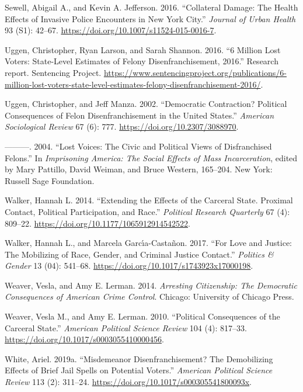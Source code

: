 \documentclass[12pt,]{article}
\begin{document}
\leavevmode\hypertarget{ref-Sewell2016}{}%
Sewell, Abigail A., and Kevin A. Jefferson. 2016. ``Collateral Damage: The Health Effects of Invasive Police Encounters in New York City.'' \emph{Journal of Urban Health} 93 (S1): 42--67. \url{https://doi.org/10.1007/s11524-015-0016-7}.

\leavevmode\hypertarget{ref-sentencing_2016}{}%
Uggen, Christopher, Ryan Larson, and Sarah Shannon. 2016. ``6 Million Lost Voters: State-Level Estimates of Felony Disenfranchisement, 2016.'' Research report. Sentencing Project. \url{https://www.sentencingproject.org/publications/6-million-lost-voters-state-level-estimates-felony-disenfranchisement-2016/}.

\leavevmode\hypertarget{ref-Uggen2002}{}%
Uggen, Christopher, and Jeff Manza. 2002. ``Democratic Contraction? Political Consequences of Felon Disenfranchisement in the United States.'' \emph{American Sociological Review} 67 (6): 777. \url{https://doi.org/10.2307/3088970}.

\leavevmode\hypertarget{ref-Uggen2004}{}%
---------. 2004. ``Lost Voices: The Civic and Political Views of Disfranchised Felons.'' In \emph{Imprisoning America: The Social Effects of Mass Incarceration}, edited by Mary Pattillo, David Weiman, and Bruce Western, 165--204. New York: Russell Sage Foundation.

\leavevmode\hypertarget{ref-Walker2014}{}%
Walker, Hannah L. 2014. ``Extending the Effects of the Carceral State. Proximal Contact, Political Participation, and Race.'' \emph{Political Research Quarterly} 67 (4): 809--22. \url{https://doi.org/10.1177/1065912914542522}.

\leavevmode\hypertarget{ref-Walker2017}{}%
Walker, Hannah L., and Marcela Garcı́a-Castañon. 2017. ``For Love and Justice: The Mobilizing of Race, Gender, and Criminal Justice Contact.'' \emph{Politics \& Gender} 13 (04): 541--68. \url{https://doi.org/10.1017/s1743923x17000198}.

\leavevmode\hypertarget{ref-Weaver2014}{}%
Weaver, Vesla, and Amy E. Lerman. 2014. \emph{Arresting Citizenship: The Democratic Consequences of American Crime Control}. Chicago: University of Chicago Press.

\leavevmode\hypertarget{ref-Weaver2010}{}%
Weaver, Vesla M., and Amy E. Lerman. 2010. ``Political Consequences of the Carceral State.'' \emph{American Political Science Review} 104 (4): 817--33. \url{https://doi.org/10.1017/s0003055410000456}.

\leavevmode\hypertarget{ref-White2019}{}%
White, Ariel. 2019a. ``Misdemeanor Disenfranchisement? The Demobilizing Effects of Brief Jail Spells on Potential Voters.'' \emph{American Political Science Review} 113 (2): 311--24. \url{https://doi.org/10.1017/s000305541800093x}.
\end{document}
